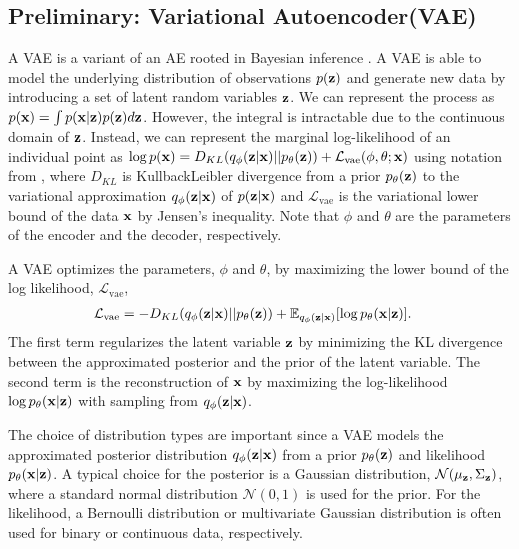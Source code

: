 \documentclass[letterpaper, 10 pt, conference]{ieeeconf}
\newcommand{\vz}{{\bf z}}
\newcommand{\vx}{{\bf x}}
\begin{document}
\subsection{Preliminary: Variational Autoencoder(VAE)}
A VAE is a variant of an AE rooted in Bayesian inference \cite{kingma2013auto}. A VAE is able to model the underlying distribution of observations $p(\vz)$ and generate new data by introducing a set of latent random variables $\vz$. We can represent the process as $p(\vx)=\int p(\vx|\vz)p(\vz) d\vz$. However, the integral is intractable due to the continuous domain of $\vz$. Instead, we can represent the marginal log-likelihood of an individual point as $\log p(\vx) = D_{KL}(q_{\phi}(\vz|\vx)||p_{\theta}(\vz)) +\mathcal{L_{\mathrm{vae}}}(\phi, \theta;\vx)$ using notation from \cite{kingma2013auto}, where $D_{KL}$ is Kullback\-Leibler divergence from a prior $p_{\theta}(\vz)$ to the variational approximation $q_{\phi}(\vz|\vx)$ of $p(\vz|\vx)$ and $\mathcal{L_{\mathrm{vae}}}$ is the variational lower bound of the data $\vx$ by Jensen's inequality. Note that $\phi$ and $\theta$ are the parameters of the encoder and the decoder, respectively.

A VAE optimizes the parameters, $\phi$ and $\theta$, by maximizing the lower bound of the log likelihood, $\mathcal{L_{\mathrm{vae}}}$,
\begin{align}
\mathcal{L_{\mathrm{vae}}} &= -D_{KL}(q_{\phi}(\vz|\vx)||p_{\theta}(\vz)) + \mathbb{E}_{q_{\phi}(\vz|\vx)}[\log p_{\theta}(\vx|\vz)].
\label{eq_lower_bound}
\end{align}The first term regularizes the latent variable $\vz$ by minimizing the KL divergence between the approximated posterior and the prior of the latent variable. The second term is the reconstruction of $\vx$ by maximizing the log-likelihood $\log p_{\theta}(\vx|\vz)$ with sampling from $q_{\phi}(\vz|\vx)$. 

The choice of distribution types are important since a VAE models the approximated posterior distribution $q_\phi(\vz|\vx)$ from a prior $p_{\theta}(\vz)$ and likelihood $p_{\theta}(\vx | \vz)$. A typical choice for the posterior is a Gaussian distribution, $\mathcal{N}(\mu_{\vz},\Sigma_{\vz})$, where a standard normal distribution $\mathcal{N}(0,1)$ is used for the prior. For the likelihood, a Bernoulli distribution or multivariate Gaussian distribution is often used for binary or continuous data, respectively.
\end{document}
